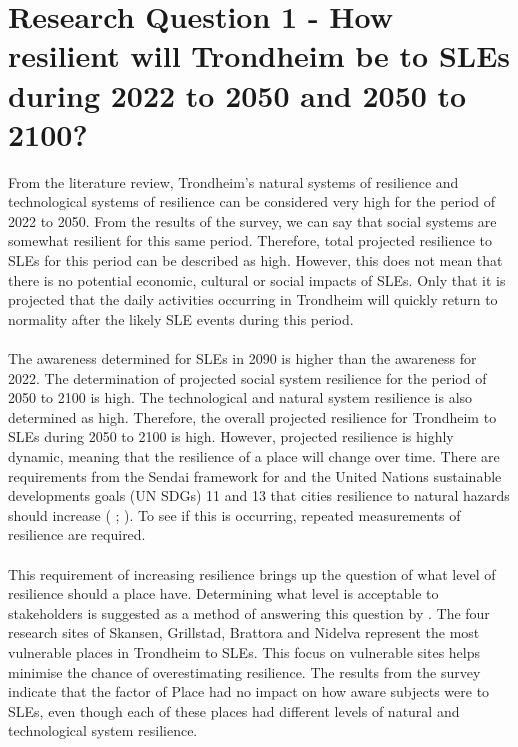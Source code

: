 \section{Research Question 1 - How resilient will Trondheim be to SLEs during 2022 to 2050 and 2050 to 2100? } \label{RQ1-findings}
From the literature review, Trondheim's natural systems of resilience and technological systems of resilience can be considered very high for the period of 2022 to 2050. From the results of the survey,  we can say that social systems are somewhat resilient for this same period. Therefore, total projected resilience to SLEs for this period can be described as high. However, this does not mean that there is no potential economic, cultural or social impacts of SLEs. Only that it is projected that the daily activities occurring in Trondheim will quickly return to normality after the likely SLE events during this period.
\paragraph{}
The awareness determined for SLEs in 2090 is higher than the awareness for 2022. The determination of projected social system resilience for the period of 2050 to 2100 is high. The technological and natural system resilience is also determined as high. Therefore, the overall projected resilience for Trondheim to SLEs during 2050 to 2100 is high. However, projected resilience is highly dynamic, meaning that the resilience of a place will change over time. There are requirements from the Sendai framework for and the United Nations sustainable developments goals (UN SDGs) 11 and 13 that cities resilience to natural hazards should increase (\cite{gonzalez-riancho_storm_2017} ; \cite{un_sustainable_2021}). To see if this is occurring, repeated measurements of resilience are required. 

\paragraph{}
This requirement of increasing resilience brings up the question of what level of resilience should a place have. Determining what level is acceptable to stakeholders is suggested as a method of answering this question by \cite{gerkensmeier_governing_2018}. The four research sites of Skansen, Grillstad, Brattora and Nidelva represent the most vulnerable places in Trondheim to SLEs. This focus on vulnerable sites helps minimise the chance of overestimating resilience. The results from the survey indicate that the factor of Place had no impact on how aware subjects were to SLEs, even though each of these places had different levels of natural and technological system resilience. 
